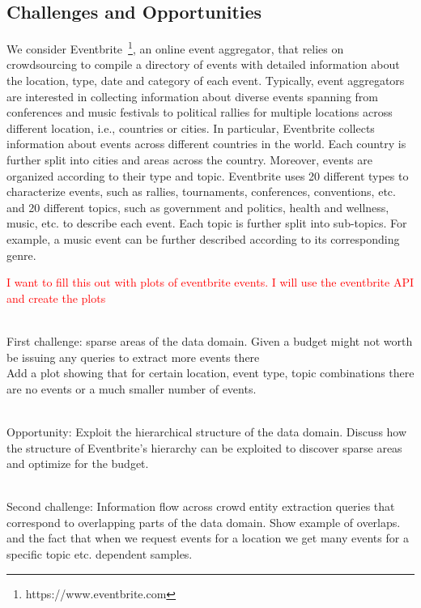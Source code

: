 \documentclass{vldb}
\begin{document}
\subsection{Challenges and Opportunities}
\label{sec:challenges}
We consider Eventbrite~\footnote{https://www.eventbrite.com}, an online event aggregator, that relies on crowdsourcing to compile a directory of events with detailed information about the location, type, date and category of each event. Typically, event aggregators are interested in collecting information about diverse events spanning from conferences and music festivals to political rallies for multiple locations across different location, i.e., countries or cities. In particular, Eventbrite collects information about events across different countries in the world. Each country is further split into cities and areas across the country. Moreover, events are organized according to their type and topic. Eventbrite uses 20 different types to characterize events, such as rallies, tournaments, conferences, conventions, etc. and 20 different topics, such as government and politics, health and wellness, music, etc.  to describe each event. Each topic is further split into sub-topics. For example, a  music event can be further described according to its corresponding genre. 

\textcolor{red}{I want to fill this out with plots of eventbrite events. I will use the eventbrite API and create the plots}

\ \\First challenge: sparse areas of the data domain. Given a budget might not worth be issuing any queries to extract more events there
\ \\Add a plot showing that for certain location, event type, topic combinations there are no events or a much smaller number of events. 

\ \\Opportunity: Exploit the hierarchical structure of the data domain. Discuss how the structure of Eventbrite's hierarchy can be exploited to discover sparse areas and optimize for the budget.

\ \\Second challenge: Information flow across crowd entity extraction queries that correspond to overlapping parts of the data domain. Show example of overlaps. and the fact that when we request events for a location we get many events for a specific topic etc. dependent samples.
\end{document}
